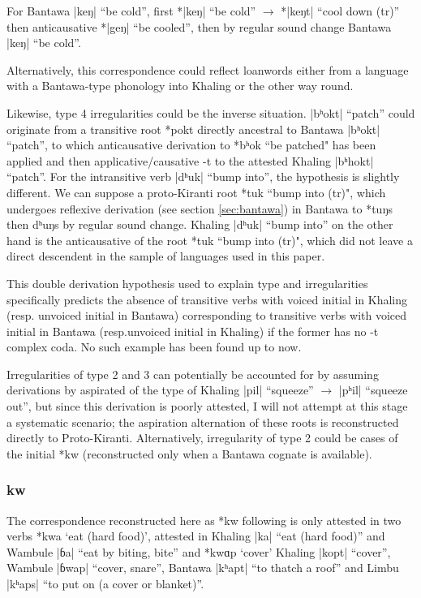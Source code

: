 \documentclass[oldfontcommands,oneside,a4paper,11pt]{article}
\newcommand{\ipa}[1]{{\phon\mbox{#1}}} %
\newcommand{\dhatu}[2]{|\ipa{#1}| ``#2''}
\begin{document}
 For Bantawa \dhatu{keŋ}{be cold}, first *\dhatu{keŋ}{be cold} $\rightarrow$ *\dhatu{keŋt}{cool down (tr)} then anticausative *\dhatu{geŋ}{be cooled}, then by regular sound change Bantawa \dhatu{keŋ}{be cold}.
 
 Alternatively, this correspondence could reflect loanwords either from a language with a Bantawa-type phonology into Khaling or the other way round.
 
Likewise, type 4  irregularities could be the inverse situation. \dhatu{bʰokt}{patch} could originate from a transitive root *\ipa{pokt} directly ancestral to Bantawa \dhatu{bʰokt}{patch}, to which anticausative derivation to *\ipa{bʰok} ``be patched" has been applied and then applicative/causative \ipa{-t} to the attested Khaling \dhatu{bʰhokt}{patch}. For the intransitive verb \dhatu{dʰuk}{bump into}, the hypothesis is slightly different. We can suppose a proto-Kiranti root *\ipa{tuk} ``bump into (tr)", which undergoes reflexive derivation (see section \ref{sec:bantawa}) in Bantawa to *\ipa{tuŋs} then \ipa{dʰuŋs} by regular sound change. Khaling \dhatu{dʰuk}{bump into} on the other hand is the anticausative of the root *\ipa{tuk} ``bump into (tr)", which did not leave a direct descendent in the sample of languages used in this paper.
 
 This double derivation hypothesis used to explain type  and irregularities specifically predicts the absence of transitive verbs with voiced initial in Khaling (resp. unvoiced initial in Bantawa) corresponding to transitive verbs with voiced initial in Bantawa (resp.unvoiced initial in Khaling) if the former has no \ipa{-t} complex coda. No such example has been found up to now.
 
 Irregularities of type 2 and 3 can potentially be accounted for by assuming derivations by aspirated of the type of Khaling \dhatu{pil}{squeeze} $\rightarrow$ \dhatu{pʰil}{squeeze out}, but since this derivation is poorly attested, I will not attempt at this stage a systematic scenario; the aspiration alternation of these roots is reconstructed directly to Proto-Kiranti. Alternatively, irregularity of type  2 could be cases of the initial *\ipa{kw} (reconstructed only when a Bantawa cognate is available).

\subsubsection{\ipa{kw}}
The correspondence reconstructed here as *\ipa{kw} following \citet{opgenort04implosives} is only attested in two verbs *\ipa{kwa} `eat (hard food)', attested in Khaling \dhatu{ka}{eat (hard food)} and Wambule \dhatu{ɓa}{eat by biting, bite} and  *\ipa{kwɑp} `cover' Khaling \dhatu{kopt}{cover}, Wambule \dhatu{ɓwap}{cover, snare}, Bantawa \dhatu{kʰapt}{to thatch a roof} and Limbu  \dhatu{kʰaps}{to put on (a cover or blanket)}. 
 
\end{document}
